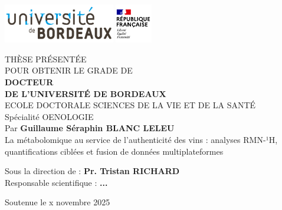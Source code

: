 \pagestyle{empty}
  \includegraphics[height=1.7cm]{0_Liminaires/Images/UBX_logo.png}\hfill
  \includegraphics[height=1.7cm]{0_Liminaires/Images/RF.png}\hfill %
  
  \vspace{0.5cm}
  
  \begin{center}
  \linespread{1.6}\selectfont %
  \begin{Large}
  THÈSE PRÉSENTÉE\\
  POUR OBTENIR LE GRADE DE \\
  {\LARGE \textbf{DOCTEUR\\DE L'UNIVERSITÉ DE BORDEAUX}}\\
  \vspace{0.55cm}
  ECOLE DOCTORALE SCIENCES DE LA VIE ET DE LA SANTÉ\\
  {\normalsize Spécialité OENOLOGIE} \\
  \vspace{0.55cm}
  Par \textbf{Guillaume Séraphin BLANC LELEU} \\
  \vspace{0.55cm}
  {\Large La métabolomique au service de l’authenticité des vins : analyses RMN-¹H, quantifications ciblées et fusion de données multiplateformes}
  \end{Large}
  
  \vspace{0.55cm}
  
  \linespread{1.05}\selectfont
  {\normalsize
  Sous la direction de : \textbf{Pr. Tristan RICHARD}\\
  Responsable scientifique : \textbf{...}
  }
  \end{center}
  
  \vfill
  
  \begin{center}
  {\large Soutenue le x novembre 2025 }\\    
  \end{center}
  
